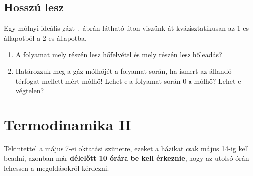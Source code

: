 \documentclass[12pt,a4paper]{scrartcl}
\begin{document}
\subsection{Hosszú lesz}
Egy mólnyi ideális gázt .\ ábrán látható úton viszünk át kvázisztatikusan az 1-es állapotból a 2-es állapotba.
\begin{enumerate}
\item A folyamat mely részén lesz hőfelvétel és mely részén lesz hőleadás?
\item Határozzuk meg a gáz mólhőjét a folyamat során, ha ismert az állandó térfogat mellett mért mólhő! Lehet-e a folyamat során 0 a mólhő? Lehet-e végtelen?
\end{enumerate}

\section{Termodinamika II}
Tekintettel a május 7-ei oktatási szünetre, ezeket a házikat csak május 14-ig kell beadni, azonban már \textbf{délelőtt 10 órára be kell érkeznie}, hogy az utolsó órán lehessen a megoldásokról kérdezni.
\end{document}
